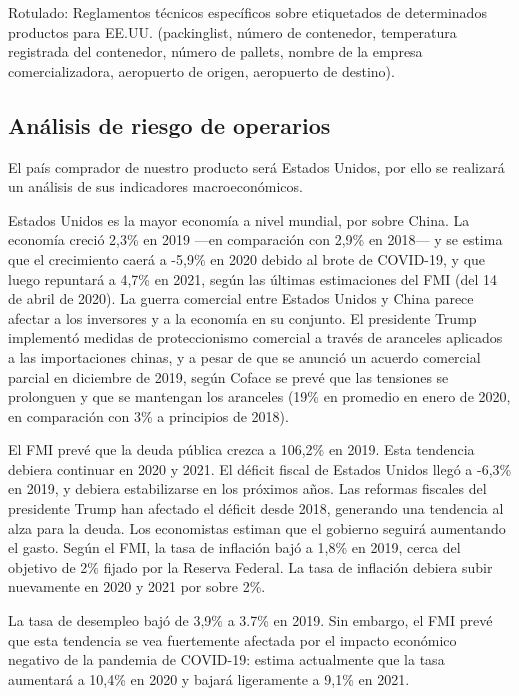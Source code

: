 \documentclass[
  stu,
  floatsintext,
  longtable,
  a4paper,
  nolmodern,
  notxfonts,
  notimes,
  12pt,
  colorlinks=true,linkcolor=blue,citecolor=blue,urlcolor=blue]{apa7}
\begin{document}
Rotulado: Reglamentos técnicos específicos sobre etiquetados de
determinados productos para EE.UU. (packinglist, número de contenedor,
temperatura registrada del contenedor, número de pallets, nombre de la
empresa comercializadora, aeropuerto de origen, aeropuerto de destino).

\subsection{Análisis de riesgo de
operarios}\label{anuxe1lisis-de-riesgo-de-operarios}

El país comprador de nuestro producto será Estados Unidos, por ello se
realizará un análisis de sus indicadores macroeconómicos.

Estados Unidos es la mayor economía a nivel mundial, por sobre China. La
economía creció 2,3\% en 2019 ---en comparación con 2,9\% en 2018--- y
se estima que el crecimiento caerá a -5,9\% en 2020 debido al brote de
COVID-19, y que luego repuntará a 4,7\% en 2021, según las últimas
estimaciones del FMI (del 14 de abril de 2020). La guerra comercial
entre Estados Unidos y China parece afectar a los inversores y a la
economía en su conjunto. El presidente Trump implementó medidas de
proteccionismo comercial a través de aranceles aplicados a las
importaciones chinas, y a pesar de que se anunció un acuerdo comercial
parcial en diciembre de 2019, según Coface se prevé que las tensiones se
prolonguen y que se mantengan los aranceles (19\% en promedio en enero
de 2020, en comparación con 3\% a principios de 2018).

El FMI prevé que la deuda pública crezca a 106,2\% en 2019. Esta
tendencia debiera continuar en 2020 y 2021. El déficit fiscal de Estados
Unidos llegó a -6,3\% en 2019, y debiera estabilizarse en los próximos
años. Las reformas fiscales del presidente Trump han afectado el déficit
desde 2018, generando una tendencia al alza para la deuda. Los
economistas estiman que el gobierno seguirá aumentando el gasto. Según
el FMI, la tasa de inflación bajó a 1,8\% en 2019, cerca del objetivo de
2\% fijado por la Reserva Federal. La tasa de inflación debiera subir
nuevamente en 2020 y 2021 por sobre 2\%.

La tasa de desempleo bajó de 3,9\% a 3.7\% en 2019. Sin embargo, el FMI
prevé que esta tendencia se vea fuertemente afectada por el impacto
económico negativo de la pandemia de COVID-19: estima actualmente que la
tasa aumentará a 10,4\% en 2020 y bajará ligeramente a 9,1\% en 2021.
\end{document}
